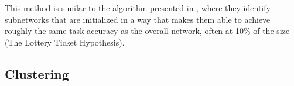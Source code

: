 \documentclass[11pt]{article}
\begin{document}
This method is similar to the algorithm presented in \citet{frankle2018the}, where they identify subnetworks that are initialized in a way that makes them able to achieve roughly the same task accuracy as the overall network, often at 10\% of the size (The Lottery Ticket Hypothesis).

\subsection{Clustering}
\citet{watanabe2019interpreting, casper2022graphical}

\newpage

\end{document}
